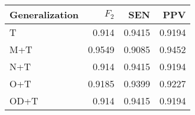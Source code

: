 \begin{table}[htbp]
  \caption{}
  \label{tab:}
  \centering
  \begin{tabular}[h]{@{}lrrr@{}}
    \toprule
    Generalization & \(F_2\) & SEN & PPV \\
    \midrule
T	&	0.914	&	0.9415	&	0.9194 \\
M+T	&	0.9549	&	0.9085	&	0.9452 \\
N+T	&	0.914	&	0.9415	&	0.9194 \\
O+T	&	0.9185	&	0.9399	&	0.9227 \\
OD+T	&	0.914	&	0.9415	&	0.9194 \\
    \bottomrule
  \end{tabular}
\end{table}
